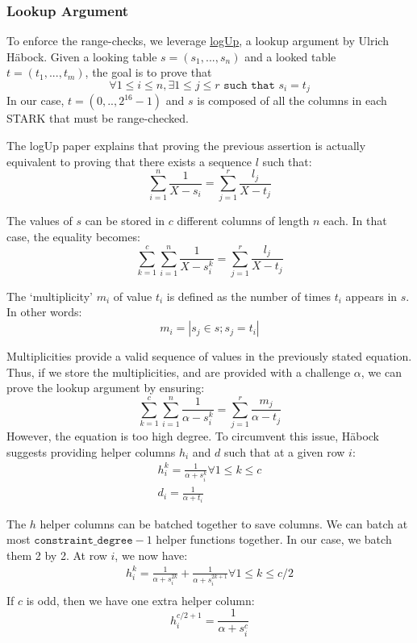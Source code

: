 \subsubsection{Lookup Argument}
To enforce the range-checks, we leverage \href{https://eprint.iacr.org/2022/1530.pdf}{logUp}, a lookup argument by Ulrich Häbock. Given a looking table $s = (s_1, ..., s_n)$ and a looked table $t = (t_1, ..., t_m)$, the goal is to prove that 
$$\forall 1 \leq i \leq n, \exists 1 \leq j \leq r \texttt{ such that } s_i = t_j$$
In our case, $t = (0, .., 2^{16} - 1)$ and $s$ is composed of all the columns in each STARK that must be range-checked. 

The logUp paper explains that proving the previous assertion is actually equivalent to proving that there exists a sequence $l$ such that:
$$ \sum_{i=1}^n \frac{1}{X - s_i} = \sum_{j=1}^r \frac{l_j}{X-t_j}$$

The values of $s$ can be stored in $c$ different columns of length $n$ each. In that case, the equality becomes:
$$\sum_{k=1}^c \sum_{i=1}^n \frac{1}{X - s_i^k} = \sum_{j=1}^r \frac{l_j}{X-t_j}$$

The `multiplicity' $m_i$ of value $t_i$ is defined as the number of times $t_i$ appears in $s$. In other words:
$$m_i = |s_j \in s; s_j = t_i|$$

Multiplicities provide a valid sequence of values in the previously stated equation. Thus, if we store the multiplicities, and are provided with a challenge $\alpha$, we can prove the lookup argument by ensuring:
$$\sum_{k=1}^c \sum_{i=1}^n \frac{1}{\alpha - s_i^k} = \sum_{j=1}^r \frac{m_j}{\alpha-t_j}$$
However, the equation is too high degree. To circumvent this issue, Häbock suggests providing helper columns $h_i$ and $d$ such that at a given row $i$:
\begin{gather*}
  h_i^k = \frac{1}{\alpha + s_i^k } \forall 1 \leq k \leq c \\
  d_i = \frac{1}{\alpha + t_i}
\end{gather*}

The $h$ helper columns can be batched together to save columns. We can batch at most $\texttt{constraint\_degree} - 1$ helper functions together. In our case, we batch them 2 by 2. At row $i$, we now have:
\begin{align*}
  h_i^k = \frac{1}{\alpha + s_i^{2k}} + \frac{1}{\alpha + s_i^{2k+1}} \forall 1 \leq k \leq c/2 \\
\end{align*}
If $c$ is odd, then we have one extra helper column:
$$h_i^{c/2+1} = \frac{1}{\alpha + s_i^{c}}$$

